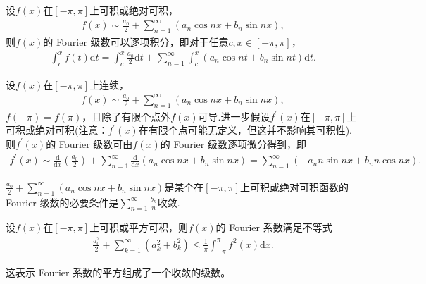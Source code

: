 \documentclass[../../main.tex]{subfiles}
\begin{document}
\begin{theorem}[Fourier级数的逐项积分定理]\label{theorem:Fourier级数的逐项积分定理}
设$f(x)$在$[-\pi,\pi]$上可积或绝对可积，
\begin{align*}
f(x)\sim\frac{a_0}{2}+\sum_{n = 1}^{\infty}(a_n\cos nx + b_n\sin nx),
\end{align*}
则$f(x)$的 Fourier 级数可以逐项积分，即对于任意$c,x\in[-\pi,\pi]$，
\begin{align*}
\int_{c}^{x}f(t)\mathrm{d}t=\int_{c}^{x}\frac{a_0}{2}\mathrm{d}t+\sum_{n = 1}^{\infty}\int_{c}^{x}(a_n\cos nt + b_n\sin nt)\mathrm{d}t.
\end{align*}
\end{theorem}

\begin{theorem}[Fourier级数的逐项微分定理]\label{theorem:Fourier级数的逐项微分定理}
设$f(x)$在$[-\pi,\pi]$上连续，
\begin{align*}
f(x)\sim\frac{a_0}{2}+\sum_{n = 1}^{\infty}(a_n\cos nx + b_n\sin nx),
\end{align*}
$f(-\pi)=f(\pi)$，且除了有限个点外$f(x)$可导.进一步假设$f^{\prime}(x)$在$[-\pi,\pi]$上可积或绝对可积(注意：$f^{\prime}(x)$在有限个点可能无定义，但这并不影响其可积性). 则$f^{\prime}(x)$的 Fourier 级数可由$f(x)$的 Fourier 级数逐项微分得到，即
\begin{align*}
f^{\prime}(x)\sim\frac{\mathrm{d}}{\mathrm{d}x}\left(\frac{a_0}{2}\right)+\sum_{n = 1}^{\infty}\frac{\mathrm{d}}{\mathrm{d}x}(a_n\cos nx + b_n\sin nx)=\sum_{n = 1}^{\infty}(-a_nn\sin nx + b_nn\cos nx).
\end{align*}
\end{theorem}

\begin{corollary}
$\frac{a_0}{2}+\sum_{n = 1}^{\infty}(a_n\cos nx + b_n\sin nx)$是某个在$[-\pi,\pi]$上可积或绝对可积函数的 Fourier 级数的必要条件是$\sum_{n = 1}^{\infty}\frac{b_n}{n}$收敛. 
\end{corollary}

\begin{theorem}[Bessel不等式]\label{theorem:Bessel不等式}
设$f(x)$在$[-\pi,\pi]$上可积或平方可积，则$f(x)$的 Fourier 系数满足不等式
\begin{align*}
\frac{a_0^2}{2}+\sum_{k = 1}^{\infty}(a_k^2 + b_k^2)\leq\frac{1}{\pi}\int_{-\pi}^{\pi}f^2(x)\mathrm{d}x.
\end{align*}
\end{theorem}
\begin{note}
这表示 Fourier 系数的平方组成了一个收敛的级数。
\end{note}
\end{document}
